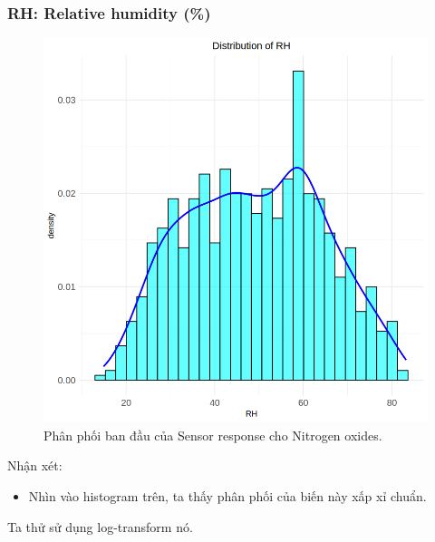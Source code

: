 \subsubsection{RH: Relative humidity (\%)}

\begin{figure}[H]
    \centering
    \includegraphics[width=0.75\columnwidth]{air_figures/RH_original_distribution.png}
    \caption{Phân phối ban đầu của Sensor response cho Nitrogen oxides.}
    \label{fig:rh_original_distribution}
\end{figure}

Nhận xét:
\begin{itemize}
    \item Nhìn vào histogram trên, ta thấy phân phối của biến này xấp xỉ chuẩn.
\end{itemize}

Ta thử sử dụng log-transform nó.


